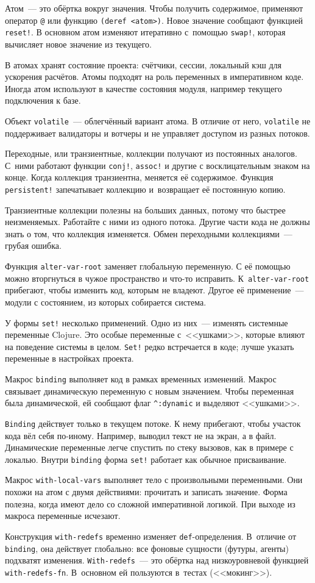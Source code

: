 Атом~--- это обёртка вокруг значения. Чтобы получить содержимое, применяют
оператор \verb|@| или функцию \verb|(deref <atom>)|. Новое значение сообщают
функцией \verb|reset!|. В основном атом изменяют итеративно с~помощью
\verb|swap!|, которая вычисляет новое значение из текущего.

В атомах хранят состояние проекта: счётчики, сессии, локальный кэш для ускорения
расчётов. Атомы подходят на роль переменных в императивном коде. Иногда атом
используют в качестве состояния модуля, например текущего подключения к базе.

Объект \verb|volatile|~--- облегчённый вариант атома. В отличие от него,
\verb|volatile| не поддерживает валидаторы и вотчеры и не управляет доступом из
разных потоков.

Переходные, или транзиентные, коллекции получают из постоянных аналогов. С~ними
работают функции \verb|conj!|, \verb|assoc!| и другие с восклицательным знаком
на конце.  Когда коллекция транзиентна, меняется её содержимое. Функция
\verb|persistent!| запечатывает коллекцию и~возвращает её постоянную копию.

Транзиентные коллекции полезны на больших данных, потому что быстрее
неизменяемых. Работайте с ними из одного потока. Другие части кода не должны
знать о том, что коллекция изменяется. Обмен переходными коллекциями~--- грубая
ошибка.

Функция \verb|alter-var-root| заменяет глобальную переменную. С её помощью можно
вторгнуться в чужое пространство и что-то исправить. К~\verb|alter-var-root|
прибегают, чтобы изменить код, которым не владеют. Другое её применение~---
модули с состоянием, из которых собирается система.

У формы \verb|set!| несколько применений. Одно из них~--- изменять системные
переменные Clojure. Это особые переменные с~<<ушками>>, которые влияют на
поведение системы в целом. \verb|Set!| редко встречается в коде; лучше указать
переменные в настройках проекта.

Макрос \verb|binding| выполняет код в рамках временных изменений. Макрос
связывает динамическую переменную с новым значением. Чтобы переменная была
динамической, ей сообщают флаг \verb|^:dynamic| и выделяют <<ушками>>.

\verb|Binding| действует только в текущем потоке. К нему прибегают, чтобы
участок кода вёл себя по-иному. Например, выводил текст не на экран, а в
файл. Динамические переменные легче спустить по стеку вызовов, как в примере с
локалью. Внутри \verb|binding| форма \verb|set!| работает как обычное
присваивание.

Макрос \verb|with-local-vars| выполняет тело с произвольными переменными. Они
похожи на атом с двумя действиями: прочитать и записать значение. Форма полезна,
когда имеют дело со сложной императивной логикой. При выходе из макроса
переменные исчезают.

Конструкция \verb|with-redefs| временно изменяет
\verb|def|-оп\-ре\-де\-ле\-ния. В~отличие от \verb|binding|, она действует глобально:
все фоновые сущности (футуры, агенты) подхватят
изменения. \verb|With-redefs|~--- это обёртка над низкоуровневой функцией
\texttt{with-redefs-fn}. В~основном ей пользуются в~тестах (<<мокинг>>).
